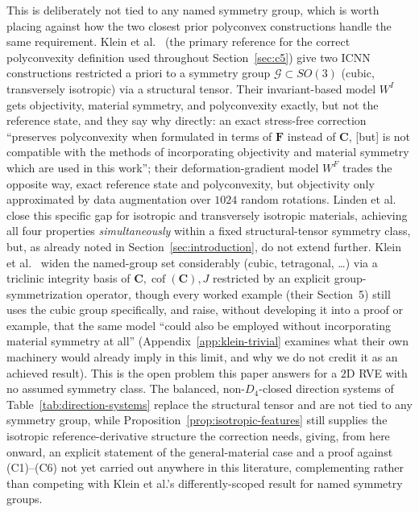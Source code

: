 \documentclass[10pt,a4paper]{article}
\newcommand{\Cof}{\operatorname{cof}}
\begin{document}
\label{sec:related-klein-linden}This is deliberately not tied to any
named symmetry group, which is worth placing against how the two closest
prior polyconvex constructions handle the same requirement. Klein et
al.~\cite{Klein2022} (the primary reference for the correct polyconvexity
definition used throughout Section~\ref{sec:c5}) give two ICNN
constructions restricted a priori to a symmetry group $\mathcal G\subset
SO(3)$ (cubic, transversely isotropic) via a structural tensor. Their
invariant-based model $W^I$ gets objectivity, material symmetry, and
polyconvexity exactly, but not the reference state, and they say why
directly: an exact stress-free correction ``preserves polyconvexity when
formulated in terms of $\bm F$ instead of $\bm C$, [but] is not
compatible with the methods of incorporating objectivity and material
symmetry which are used in this work''; their deformation-gradient model
$W^F$ trades the opposite way, exact reference state and polyconvexity,
but objectivity only approximated by data augmentation over $1024$
random rotations. Linden et al.~\cite{Linden2023} close this specific gap
for isotropic and transversely isotropic materials, achieving all four
properties \emph{simultaneously} within a fixed structural-tensor
symmetry class, but, as already noted in
Section~\ref{sec:introduction}, do not extend further. Klein et
al.~\cite{Klein2026} widen the named-group set considerably (cubic,
tetragonal, \dots) via a triclinic integrity basis of $\bm C,\Cof(\bm
C),J$ restricted by an explicit group-symmetrization operator, though
every worked example (their Section~5) still uses the cubic group
specifically, and raise, without developing it into a proof or example,
that the same model ``could also be employed without incorporating
material symmetry at all'' (Appendix~\ref{app:klein-trivial} examines
what their own machinery would already imply in this limit, and why we
do not credit it as an achieved result). This is the open problem this
paper answers for a $2$D RVE with no assumed symmetry
class.\label{sec:related-gap} The balanced, non-$D_4$-closed direction
systems of Table~\ref{tab:direction-systems} replace the structural
tensor and are not tied to any symmetry group, while
Proposition~\ref{prop:isotropic-features} still supplies the isotropic
reference-derivative structure the correction needs, giving, from here
onward, an explicit statement of the general-material case and a proof
against (C1)--(C6) not yet carried out anywhere in this literature,
complementing rather than competing with Klein et al.'s
differently-scoped result for named symmetry groups.
\end{document}
